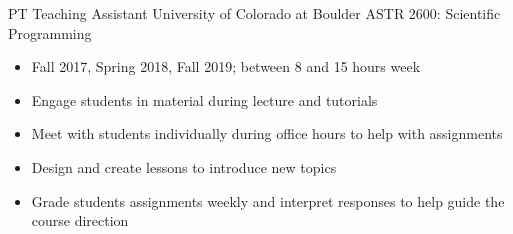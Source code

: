     {PT} %
    {Teaching Assistant} %
    {University of Colorado at Boulder} %
    {ASTR 2600: Scientific Programming}
    {\begin{itemize}
    \setlength\itemsep{0.1em} 
        \item Fall 2017, Spring 2018, Fall 2019; between 8 and 15 hours week
        \item Engage students in material during lecture and tutorials
        \item Meet with students individually during office hours to help with assignments
        \item Design and create lessons to introduce new topics
        \item Grade students assignments weekly and interpret responses to help guide the course direction
    \end{itemize}
}

